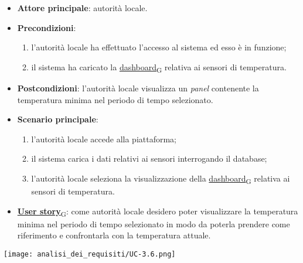 \begin{itemize}
	\item \textbf{Attore principale}: autorità locale.
	\item \textbf{Precondizioni}:
	      \begin{enumerate}
		      \item l'autorità locale ha effettuato l'accesso al sistema ed esso è in funzione;
		      \item il sistema ha caricato la \href{https://7last.github.io/docs/rtb/documentazione-interna/glossario\#dashboard}{dashboard\textsubscript{G}} relativa ai sensori di temperatura.
	      \end{enumerate}
	\item \textbf{Postcondizioni}: l'autorità locale visualizza un \textit{panel} contenente la temperatura minima nel periodo di tempo selezionato.
	\item \textbf{Scenario principale}:
	      \begin{enumerate}
		      \item l'autorità locale accede alla piattaforma;
		      \item il sistema carica i dati relativi ai sensori interrogando il database;
		      \item l'autorità locale seleziona la visualizzazione della \href{https://7last.github.io/docs/rtb/documentazione-interna/glossario\#dashboard}{dashboard\textsubscript{G}} relativa ai sensori di temperatura.
	      \end{enumerate}
	\item \href{https://7last.github.io/docs/rtb/documentazione-interna/glossario\#user-story}{\textbf{User story}\textsubscript{G}}:
	      come autorità locale desidero poter visualizzare la temperatura minima nel periodo di tempo selezionato
	      in modo da poterla prendere come riferimento e confrontarla con la temperatura attuale.
\end{itemize}
\begin{center}
	\texttt{[image: analisi\_dei\_requisiti/UC-3.6.png]}
\end{center}

